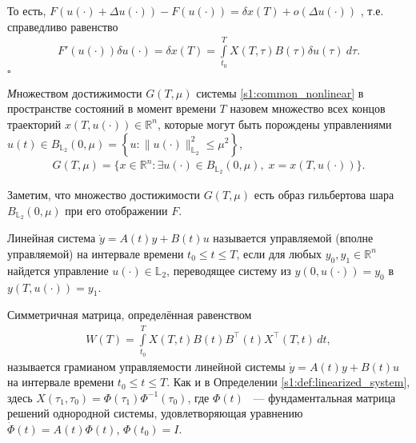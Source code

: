 \documentclass[../main.tex]{subfiles}
\begin{document}
То есть, $F(u(\cdot) + \Delta u(\cdot)) - F(u(\cdot)) = \delta x(T) + o(\Delta u(\cdot))$ , т.е.  справедливо равенство
\begin{gather}\label{s1:lem2_assert}
    F'(u(\cdot))\delta u(\cdot) =\delta x(T) = \int\limits_{t_0}^{T} X(T, \tau) B(\tau) \delta u(\tau) \ d\tau.
\end{gather}
\hfill $\square$
    
\begin{definition}
    {\textit  Множеством достижимости} $ G(T,\mu) $ системы \eqref{s1:common_nonlinear} в пространстве состояний в момент времени $ T $ назовем множество всех концов траекторий $ x(T, u(\cdot)) \in \mathbb{R}^n $,  которые могут быть порождены управлениями $ u(t) \in B_{\mathbb{L}_2}(0,\mu) =\left\lbrace u:\lVert u(\cdot)\rVert^2_{\mathbb{L}_2} \leqslant \mu^2\right\rbrace  $,
    \begin{gather*}
        G(T,\mu)=\{x\in \mathbb{R}^n:\exists u(\cdot)\in B_{\mathbb{L}_2}(0,\mu),\; x=x(T,u(\cdot))\}.
    \end{gather*}
\end{definition}
    
Заметим, что множество достижимости $G(T,\mu)$ есть образ гильбертова шара $B_{\mathbb{L}_2}(0,\mu)$ при его отображении $F$.
   
\begin{definition}
	Линейная система $\dot{y} = A(t) y + B(t) u $ называется управляемой (вполне управляемой) на интервале времени $  t_0 \leqslant t \leqslant T $,  если для любых $y_0, y_1 \in \mathbb{R}^n$ найдется управление $u(\cdot) \in \mathbb{L}_2$, переводящее систему из $y(0, u(\cdot)) = y_0 $ в $y(T, u(\cdot)) = y_1 $.
\end{definition}
   
\begin{definition}\label{s1:def:grammian}
    Симметричная матрица, определённая равенством
    \begin{gather*}
        W(T) = \int\limits_{t_0}^{T}X(T,t)B(t)B^{\top}(t)X^{\top}(T,t) \, dt,
    \end{gather*}
    называется грамианом управляемости линейной системы $\dot{y} = A(t) y + B(t) u $ на интервале времени $  t_0 \leqslant t \leqslant T $.
    Как и в Определении \ref{s1:def:linearized_system}, здесь $ X(\tau_1,\tau_0)= \Phi(\tau_1) \Phi^{-1}(\tau_0) $, где $\Phi(t) $ ~--- фундаментальная матрица решений однородной системы, удовлетворяющая уравнению $ \dot{\Phi}(t) = A(t) \Phi(t)$, $ \Phi(t_0) = I $.
\end{definition}
    
\end{document}
